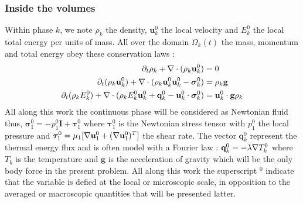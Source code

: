 \subsubsection{Inside the volumes}
Within phase $k$, we note $\rho_k$ the density, $\textbf{u}_k^0$ the local velocity and $E_k^0$ the local total energy per units of mass.
All over the domain $\Omega_k(t)$ the mass, momentum and total energy obey these conservation laws :
\begin{align}
    \label{eq:dt_rho}
    \partial_t \rho_k  
    + \mathbf{\nabla}\cdot (
        \rho_k\textbf{u}_k^0
    )
    &= 
    0\\
    \label{eq:dt_rhou_k}
    \partial_t (\rho_k\textbf{u}_k^0)  
    + \mathbf{\nabla}\cdot (
        \rho_k\textbf{u}_k^0\textbf{u}_k^0
        - \bm{\sigma}_k^0 
    )
    &= 
    \rho_k \textbf{g}\\
    \label{eq:dt_rhoE_k}
    \partial_t (\rho_kE_k^0)  
    + \mathbf{\nabla}\cdot (
        \rho_kE_k^0\textbf{u}_k^0
        + \textbf{q}_k^0
        - \textbf{u}_k^0 \cdot \bm{\sigma}_k^0 
        )
    &= 
    \textbf{u}_k^0 \cdot \textbf{g}  \rho_k
\end{align} 
All along this work the continuous phase will be considered as Newtonian fluid thus, $\bm{\sigma}_1^0 = - p_1^0 \textbf{I} + \bm{\tau}_1^0$ where $\bm{\tau}_1^0$ is the Newtonian stress tensor with $p_1 ^0$ the local pressure and $\bm{\tau}_1^0 = \mu_1[\mathbf{\nabla} \textbf{u}_1^0+(\mathbf{\nabla} \textbf{u}_1^0)^T]$ the shear rate. 
The vector $\textbf{q}_k^0$ represent the thermal energy flux and is often model with a Fourier law : $\textbf{q}_k^0 = -\lambda \mathbf{\nabla} T_k^0$ where $T_k$ is the temperature and $\textbf{g}$ is the acceleration of gravity which will be the only body force in the present problem. 
All along this work the superscript $^0$ indicate that the variable is defied at the local or microscopic scale, in opposition to the averaged or macroscopic quantities that will be presented latter. 

